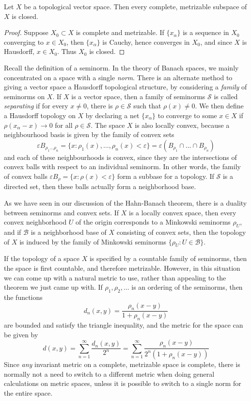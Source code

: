 \begin{theorem}
    Let $X$ be a topological vector space. Then every complete, metrizable subspace of $X$ is closed.
\end{theorem}
\begin{proof}
    Suppose $X_0 \subset X$ is complete and metrizable. If $\{ x_\alpha \}$ is a sequence in $X_0$ converging to $x \in X_0$, then $\{ x_\alpha \}$ is Cauchy, hence converges in $X_0$, and since $X$ is Hausdorff, $x \in X_0$. Thus $X_0$ is closed.
\end{proof}

Recall the definition of a seminorm. In the theory of Banach spaces, we mainly concentrated on a space with a single \emph{norm}. There is an alternate method to giving a vector space a Hausdorff topological structure, by considering a \emph{family} of seminorms on $X$. If $X$ is a vector space, then a family of seminorms $\mathcal{S}$ is called \emph{separating} if for every $x \neq 0$, there is $\rho \in \mathcal{S}$ such that $\rho(x) \neq 0$. We then define a Hausdorff topology on $X$ by declaring a net $\{ x_\alpha \}$ to converge to some $x \in X$ if $\rho(x_\alpha - x) \to 0$ for all $\rho \in \mathcal{S}$. The space $X$ is also locally convex, because a neighbourhood basis is given by the family of convex sets
%
\[ \varepsilon B_{\rho_1 \dots \rho_n} = \{ x: \rho_1(x), \dots, \rho_n(x) < \varepsilon \} = \varepsilon(B_{\rho_1} \cap \dots \cap B_{\rho_n}) \]
%
and each of these neighbourhoods is convex, since they are the intersections of convex balls with respect to an individual seminorm. In other words, the family of convex balls $\varepsilon B_\rho = \{ x : \rho(x) < \varepsilon \}$ form a subbase for a topology. If $\mathcal{S}$ is a directed set, then these balls actually form a neighborhood base.

As we have seen in our discussion of the Hahn-Banach theorem, there is a duality between seminorms and convex sets. If $X$ is a locally convex space, then every convex neighborhood $U$ of the origin corresponds to a Minkowski seminorms $\rho_U$, and if $\mathcal{B}$ is a neighborhood base of $X$ consisting of convex sets, then the topology of $X$ is induced by the family of Minkowski seminorms $\{ \rho_U : U \in \mathcal{B} \}$.

If the topology of a space $X$ is specified by a countable family of seminorms, then the space is first countable, and therefore metrizable. However, in this situation we can come up with a natural metric to use, rather than appealing to the theorem we just came up with. If $\rho_1, \rho_2, \dots$ is an ordering of the seminorms, then the functions
%
\[ d_n(x,y) = \frac{\rho_n(x - y)}{1 + \rho_n(x-y)} \]
%
are bounded and satisfy the triangle inequality, and the metric for the space can be given by
%
\[ d(x,y) = \sum_{n = 1}^\infty \frac{d_n(x,y)}{2^n} = \sum_{n = 1}^\infty \frac{\rho_n(x-y)}{2^n (1 + \rho_n(x-y))} \]
%
Since {\it any} invariant metric on a complete, metrizable space is complete, there is normally not a need to switch to a different metric when doing general calculations on metric spaces, unless it is possible to switch to a single norm for the entire space.

